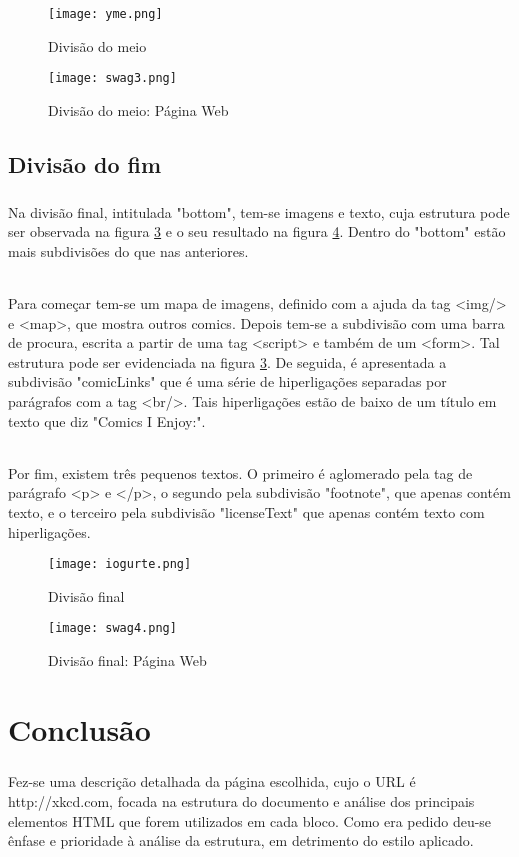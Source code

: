 \documentclass[a4paper,12pt,openright,oneside]{report}
\begin{document}
\begin{figure}[h!]
\center
\texttt{[image: yme.png]}
\caption{Divisão do meio}
\label{yme}
\end{figure}

\begin{figure}[h!]
\center
\texttt{[image: swag3.png]}
\caption{Divisão do meio: Página Web}
\label{swag3}
\end{figure}
\pagebreak
\section{Divisão do fim}
\paragraph{}
Na divisão final, intitulada "bottom", tem-se imagens e texto, cuja estrutura pode ser observada na figura \ref{iogurte} e o seu resultado na figura \ref{swag4}. Dentro do "bottom" estão mais subdivisões do que nas anteriores. 
\subparagraph{}
Para começar tem-se um mapa de imagens, definido com a ajuda da tag <img/> e <map>, que mostra outros comics. Depois tem-se a subdivisão com uma barra de procura, escrita a partir de uma tag <script> e também de um <form>. Tal estrutura pode ser evidenciada na figura \ref{iogurte}. De seguida, é apresentada a subdivisão "comicLinks" que é uma série de hiperligações separadas por parágrafos com a tag <br/>. Tais hiperligações estão de baixo de um título em texto que diz "Comics I Enjoy:". 
\subparagraph{}
Por fim, existem três pequenos textos. O primeiro é aglomerado pela tag de parágrafo <p> e </p>, o segundo pela subdivisão "footnote", que apenas contém texto, e o terceiro pela subdivisão "licenseText" que apenas contém texto com hiperligações.\cite{a}

\begin{figure}[h!]
\center
\texttt{[image: iogurte.png]}
\caption{Divisão final}
\label{iogurte}
\end{figure}

\begin{figure}[h!]
\center
\texttt{[image: swag4.png]}
\caption{Divisão final: Página Web}
\label{swag4}
\end{figure}

\chapter*{Conclusão}
\paragraph*{}
Fez-se uma descrição detalhada da página escolhida, cujo o URL é http://xkcd.com, focada na estrutura do documento e análise dos principais elementos HTML que forem utilizados em cada bloco. 
Como era pedido deu-se ênfase e prioridade à análise da estrutura, em detrimento do estilo aplicado.
\end{document}
